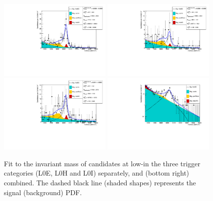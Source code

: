 %
\begin{figure}[h!]
\centering
\includegraphics[width=0.49\textwidth]{RKst/figs/Fit/fit_EE/KstEE_low_L0E.pdf}
\includegraphics[width=0.49\textwidth]{RKst/figs/Fit/fit_EE/KstEE_low_L0H.pdf}
\includegraphics[width=0.49\textwidth]{RKst/figs/Fit/fit_EE/KstEE_low_L0I.pdf}
\includegraphics[width=0.49\textwidth]{RKst/figs/Fit/fit_EE/fit_EEc_log.pdf}
\caption{Fit to the \mKpiee invariant mass of \BdToKstee candidates at low-\qsq in the three trigger categories (L0E, L0H and L0I) separately, and (bottom right) combined. The dashed black line (shaded shapes) represents the signal (background) PDF.}
\label{fig:fitEE_central}
\end{figure}

